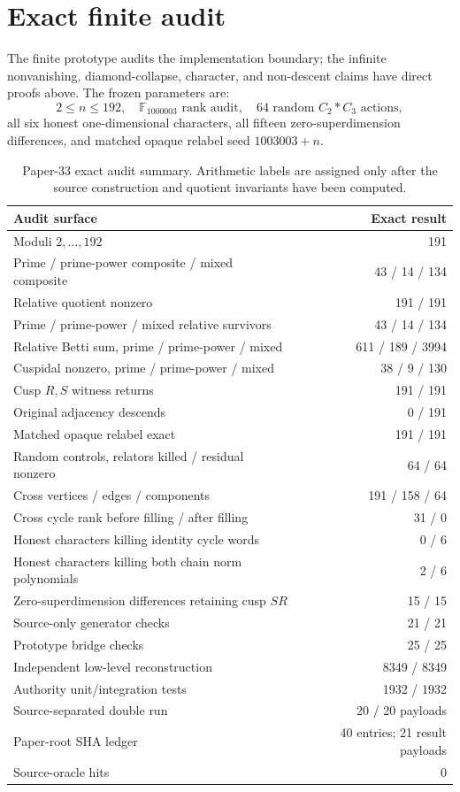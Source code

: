 \section{Exact finite audit}
\label{sec:audit}

The finite prototype audits the implementation boundary; the infinite
nonvanishing, diamond-collapse, character, and non-descent claims have direct
proofs above.  The frozen parameters are:
\[
  2\le n\le192,\quad \mathbb F_{1000003}\text{ rank audit},\quad
  64\text{ random }C_2*C_3\text{ actions},
\]
all six honest one-dimensional characters, all fifteen zero-superdimension
differences, and matched opaque relabel seed $1003003+n$.

\begin{table}[H]
\centering
\small
\begin{tabularx}{\textwidth}{L{0.47\textwidth}r}
\toprule
Audit surface & Exact result\\
\midrule
Moduli $2,\ldots,192$ & 191\\
Prime / prime-power composite / mixed composite & 43 / 14 / 134\\
Relative quotient nonzero & 191 / 191\\
Prime / prime-power / mixed relative survivors & 43 / 14 / 134\\
Relative Betti sum, prime / prime-power / mixed & 611 / 189 / 3994\\
Cuspidal nonzero, prime / prime-power / mixed & 38 / 9 / 130\\
Cusp $R,S$ witness returns & 191 / 191\\
Original adjacency descends & 0 / 191\\
Matched opaque relabel exact & 191 / 191\\
Random controls, relators killed / residual nonzero & 64 / 64\\
Cross vertices / edges / components & 191 / 158 / 64\\
Cross cycle rank before filling / after filling & 31 / 0\\
Honest characters killing identity cycle words & 0 / 6\\
Honest characters killing both chain norm polynomials & 2 / 6\\
Zero-superdimension differences retaining cusp $SR$ & 15 / 15\\
Source-only generator checks & 21 / 21\\
Prototype bridge checks & 25 / 25\\
Independent low-level reconstruction & 8349 / 8349\\
Authority unit/integration tests & 1932 / 1932\\
Source-separated double run & 20 / 20 payloads\\
Paper-root SHA ledger & 40 entries; 21 result payloads\\
Source-oracle hits & 0\\
\bottomrule
\end{tabularx}
\caption{Paper-33 exact audit summary.  Arithmetic labels are assigned only
after the source construction and quotient invariants have been computed.}
\label{tab:audit}
\end{table}

